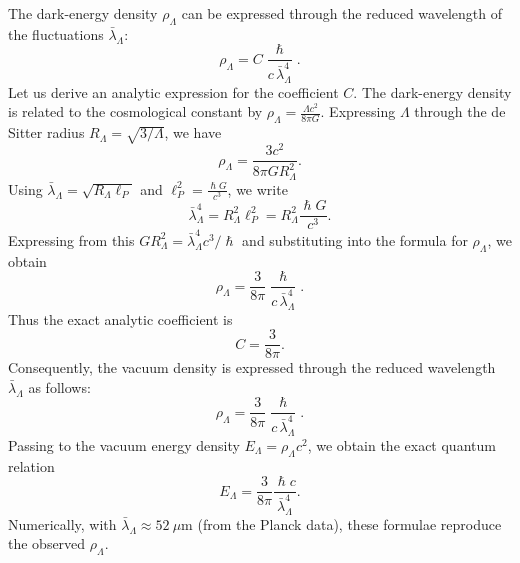 \documentclass[10pt,a4paper]{article}
\DeclareRobustCommand{\hbar}{\hslash}
\begin{document}
The dark-energy density $\rho_\Lambda$ can be expressed through the reduced wavelength of the fluctuations $\bar\lambda_\Lambda$:
\begin{equation}
\rho_\Lambda = C \frac{\hbar}{c\,\bar\lambda_\Lambda^4}.
\end{equation}
Let us derive an analytic expression for the coefficient $C$. The dark-energy density is related to the cosmological constant by $\rho_\Lambda = \frac{\Lambda c^2}{8\pi G}$. Expressing $\Lambda$ through the de Sitter radius $R_\Lambda = \sqrt{3/\Lambda}$, we have
\begin{equation}
\rho_\Lambda = \frac{3 c^2}{8\pi G R_\Lambda^2}.
\end{equation}
Using $\bar\lambda_\Lambda = \sqrt{R_\Lambda \ell_P}$ and $\ell_P^2 = \frac{\hbar G}{c^3}$, we write
\begin{equation}
\bar\lambda_\Lambda^4 = R_\Lambda^2 \ell_P^2 = R_\Lambda^2 \frac{\hbar G}{c^3}.
\end{equation}
Expressing from this $G R_\Lambda^2 = \bar\lambda_\Lambda^4 c^3/\hbar$ and substituting into the formula for $\rho_\Lambda$, we obtain
\begin{equation}
\rho_\Lambda = \frac{3}{8\pi} \frac{\hbar}{c\,\bar\lambda_\Lambda^4}.
\end{equation}
Thus the exact analytic coefficient is
\begin{equation}
\boxed{C = \frac{3}{8\pi}.}
\end{equation}
Consequently, the vacuum density is expressed through the reduced wavelength $\bar\lambda_\Lambda$ as follows:
\begin{equation}
\boxed{\rho_\Lambda = \frac{3}{8\pi} \frac{\hbar}{c\,\bar\lambda_\Lambda^4}.} \label{eq:rho_lambda_final}
\end{equation}
Passing to the vacuum energy density $E_\Lambda = \rho_\Lambda c^2$, we obtain the exact quantum relation
\begin{equation}
\boxed{E_\Lambda = \frac{3}{8\pi} \frac{\hbar c}{\bar\lambda_\Lambda^4}.}
\end{equation}
Numerically, with $\bar\lambda_\Lambda \approx 52~\mu$m (from the Planck data), these formulae reproduce the observed $\rho_\Lambda$.
\end{document}
